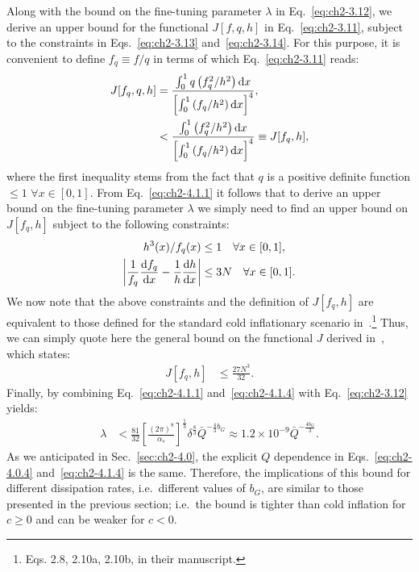 Along with the bound on the fine-tuning parameter $\lambda$ in Eq.~\ref{eq:ch2-3.12}, we derive an upper bound for the functional $J[f,q,h]$ in Eq.~\ref{eq:ch2-3.11}, subject to the constraints in Eqs.~\ref{eq:ch2-3.13} and~\ref{eq:ch2-3.14}. For this purpose, it is convenient to define $f_q\equiv f/q$ in terms of which Eq.~\ref{eq:ch2-3.11} reads:
\begin{align}
    J[f_q, q,h]&= \frac{\int_{0}^{1}q\left(f_q^{2} / h^{2}\right) {\rm d} x}{\left[\int_{0}^{1}\left(f_q/ h^{2}\right) {\rm d} x\right]^{4}}, \nonumber \\
    &< \frac{\int_{0}^{1}\left(f_q^{2} / h^{2}\right) {\rm d} x}{\left[\int_{0}^{1}\left(f_q / h^{2}\right) {\rm d} x\right]^{4}}\equiv J[f_q,h], \label{eq:ch2-4.1.1}
\end{align}
where the first inequality stems from the fact that $q$ is a positive definite function $\leq 1$ $\forall x \in[0,1]$. From Eq.~\ref{eq:ch2-4.1.1} it follows that to derive an upper bound on the fine-tuning parameter $\lambda$ we simply need to find an upper bound on $J[f_q,h]$ subject to the following constraints:
\begin{align}
    h^3(x)/f_q(x)&\leq 1 \quad \forall x \in[0,1], \label{eq:ch2-4.1.2}\\
\left|\frac{1}{f_q} \frac{{\rm d} f_q}{{\rm d} x} -\frac{1}{h}\frac{{\rm d} h}{{\rm d} x}\right| &\leq 3 N\quad \forall x \in[0,1]. \label{eq:ch2-4.1.3}
\end{align}
We now note that the above constraints and the definition of $J[f_q,h]$ are equivalent to those defined for the standard cold inflationary scenario in~\citep{Adams:1990pn}.\footnote{Eqs. 2.8, 2.10a, 2.10b, in their manuscript.} Thus, we can simply quote here the general bound on the functional $J$ derived in~\citep{Adams:1990pn}, which states:
\begin{align} J[f_q,h]&\leq \frac{27N^3}{32}. \label{eq:ch2-4.1.4}
\end{align}
Finally, by combining Eq.~\ref{eq:ch2-4.1.1} and~\ref{eq:ch2-4.1.4} with Eq.~\ref{eq:ch2-3.12} yields:
\begin{align}
    \lambda &< \frac{81}{32}\left[\frac{(2\pi)^8}{\alpha_s}\right]^{\frac{1}{3}}\delta^{\frac{8}{3}} \bar{Q}^{-\frac{4}{3}b_G}\approx 1.2\times 10^{-9} \bar{Q}^{-\frac{4b_G}{3}}. \label{eq:ch2-4.1.5}
\end{align}
As we anticipated in Sec.~\ref{sec:ch2-4.0}, the explicit $Q$ dependence in Eqs.~\ref{eq:ch2-4.0.4} and~\ref{eq:ch2-4.1.4} is the same. Therefore, the implications of this bound for different dissipation rates, i.e.\ different values of $b_G$, are similar to those presented in the previous section; i.e.\ the bound is tighter than cold inflation for $c\geq0$ and can be weaker for $c<0$.

